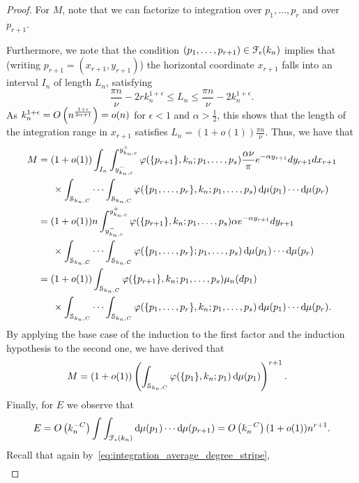 \begin{proof}
For $M$, note that we can factorize to integration over $p_1,\dots,p_r$ and over $p_{r+1}$.

Furthermore, we note that the condition $(p_1,\dots,p_{r+1})\in \mathcal{F}_\epsilon(k_n)$ implies that (writing $p_{r+1}=(x_{r+1},y_{r+1})$) the horizontal coordinate $x_{r+1}$ falls into an interval $I_n$ of length $L_n$, satisfying
\[
	\frac{\pi n}{\nu}-2rk_n^{1+\epsilon}\leq L_n\leq \frac{\pi n}{\nu}-2k_n^{1+\epsilon}.
\]
As $k_n^{1+\epsilon} = O\left(n^{\frac{1+\epsilon}{2\alpha+1}}\right) = o(n)$ for $\epsilon<1$ and $\alpha>\frac{1}{2}$, this shows that the length of the integration range in $x_{r+1}$ satisfies $L_n=(1+o(1))\frac{\pi n}{\nu}$. Thus, we have that
\begin{align*}
	M &= (1+o(1))\int_{I_n}\int_{y_{k_n,c}^-}^{y_{k_n,c}^+} \varphi(\{p_{r+1}\}, k_n ;p_1,\dots,p_s)
		\frac{\alpha\nu}{\pi} e^{-\alpha y_{r+1}}dy_{r+1}dx_{r+1}\\
	&\hspace{15pt} \times \int_{\mathcal{S}_{k_n,C}} \cdots \int_{\mathcal{S}_{k_n,C}} 
		\varphi(\{p_1,\dots,p_r\}, k_n ;p_1,\dots,p_s) \operatorname{\mathrm{d}\hspace{-2pt}} \mu(p_1) \cdots \operatorname{\mathrm{d}\hspace{-2pt}} \mu(p_{r})\\
	&=(1+o(1))n\int_{y_{k_n,c}^-}^{y_{k_n,c}^+} \varphi(\{p_{r+1}\}, k_n ;p_1,\dots,p_s)\alpha e^{-\alpha y_{r+1}}dy_{r+1}\\
	&\hspace{15pt} \times \int_{\mathcal{S}_{k_n,C}} \cdots \int_{\mathcal{S}_{k_n,C}} \varphi(\{p_1,\dots,p_r\};p_1,\dots,p_s)
		\operatorname{\mathrm{d}\hspace{-2pt}} \mu(p_1) \cdots \operatorname{\mathrm{d}\hspace{-2pt}} \mu(p_{r})\\
	&=(1+o(1))\int_{\mathcal{S}_{k_n,C}} \varphi(\{p_{r+1}\}, k_n ;p_1,\dots,p_s)\mu_n(dp_1)\\
	&\hspace{15pt} \times\int_{\mathcal{S}_{k_n,C}} \cdots \int_{\mathcal{S}_{k_n,C}} \varphi(\{p_1,\dots,p_r\}, k_n ;p_1,\dots,p_s)
		\operatorname{\mathrm{d}\hspace{-2pt}} \mu(p_1) \cdots \operatorname{\mathrm{d}\hspace{-2pt}} \mu(p_{r}).
\end{align*}
By applying the base case of the induction to the first factor and the induction hypothesis to the second one, we have derived that
\begin{align*}
M&=(1+o(1))\left(\int_{\mathcal{S}_{k_n,C}} \varphi(\{p_1\}, k_n ;p_1) \operatorname{\mathrm{d}\hspace{-2pt}} \mu(p_1) \right)^{r+1}.
\end{align*}
Finally, for $E$ we observe that
\begin{align*}
	E=O\left(k_n^{-C}\right)\int \int_{\mathcal{F}_\epsilon(k_n)} \operatorname{\mathrm{d}\hspace{-2pt}} \mu(p_1) \cdots \operatorname{\mathrm{d}\hspace{-2pt}} \mu(p_{r+1}) = O\left(k_n^{-C}\right)(1+o(1))n^{r+1}.
\end{align*}
Recall that again by~\eqref{eq:integration_average_degree_stripe},
\begin{align*}

\end{align*}
\end{proof}
